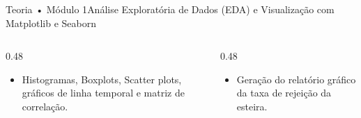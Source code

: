 \begin{senaiframe}{Teoria • Módulo 1}{Análise Exploratória de Dados (EDA) e Visualização com Matplotlib e Seaborn}
  \begin{columns}[t]
    \begin{column}{0.48\textwidth}
      \begin{tcolorbox}[senaibluecard, title={Fundamentos Teóricos}]
        \begin{itemize}
          \item Histogramas, Boxplots, Scatter plots, gráficos de linha temporal e matriz de correlação.
        \end{itemize}
      \end{tcolorbox}
    \end{column}
    \begin{column}{0.48\textwidth}
      \begin{tcolorbox}[senaigreencard, title={Prática \& Laboratório}]
        \begin{itemize}
          \item Geração do relatório gráfico da taxa de rejeição da esteira.
        \end{itemize}
      \end{tcolorbox}
    \end{column}
  \end{columns}
\end{senaiframe}
